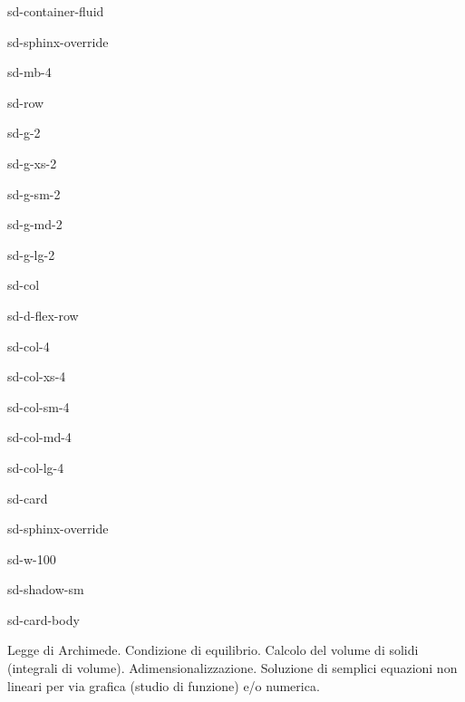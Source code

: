 \documentclass[letterpaper,10pt,italian]{jupyterBook}
\begin{document}
\begin{sphinxuseclass}{sd-container-fluid}
\begin{sphinxuseclass}{sd-sphinx-override}
\begin{sphinxuseclass}{sd-mb-4}
\begin{sphinxuseclass}{sd-row}
\begin{sphinxuseclass}{sd-g-2}
\begin{sphinxuseclass}{sd-g-xs-2}
\begin{sphinxuseclass}{sd-g-sm-2}
\begin{sphinxuseclass}{sd-g-md-2}
\begin{sphinxuseclass}{sd-g-lg-2}
\begin{sphinxuseclass}{sd-col}
\begin{sphinxuseclass}{sd-d-flex-row}
\begin{sphinxuseclass}{sd-col-4}
\begin{sphinxuseclass}{sd-col-xs-4}
\begin{sphinxuseclass}{sd-col-sm-4}
\begin{sphinxuseclass}{sd-col-md-4}
\begin{sphinxuseclass}{sd-col-lg-4}
\begin{sphinxuseclass}{sd-card}
\begin{sphinxuseclass}{sd-sphinx-override}
\begin{sphinxuseclass}{sd-w-100}
\begin{sphinxuseclass}{sd-shadow-sm}
\begin{sphinxuseclass}{sd-card-body}
\end{sphinxuseclass}
\end{sphinxuseclass}
\end{sphinxuseclass}
\end{sphinxuseclass}
\end{sphinxuseclass}
\end{sphinxuseclass}
\end{sphinxuseclass}
\end{sphinxuseclass}
\end{sphinxuseclass}
\end{sphinxuseclass}
\end{sphinxuseclass}
\end{sphinxuseclass}
\end{sphinxuseclass}
\end{sphinxuseclass}
\end{sphinxuseclass}
\end{sphinxuseclass}
\end{sphinxuseclass}
\end{sphinxuseclass}
\end{sphinxuseclass}
\end{sphinxuseclass}
\end{sphinxuseclass}
\sphinxAtStartPar
{} Legge di Archimede. Condizione di equilibrio. Calcolo del volume di
solidi (integrali di volume). Adimensionalizzazione. Soluzione di
semplici equazioni non lineari per via grafica (studio di funzione) e/o
numerica.
\end{document}
